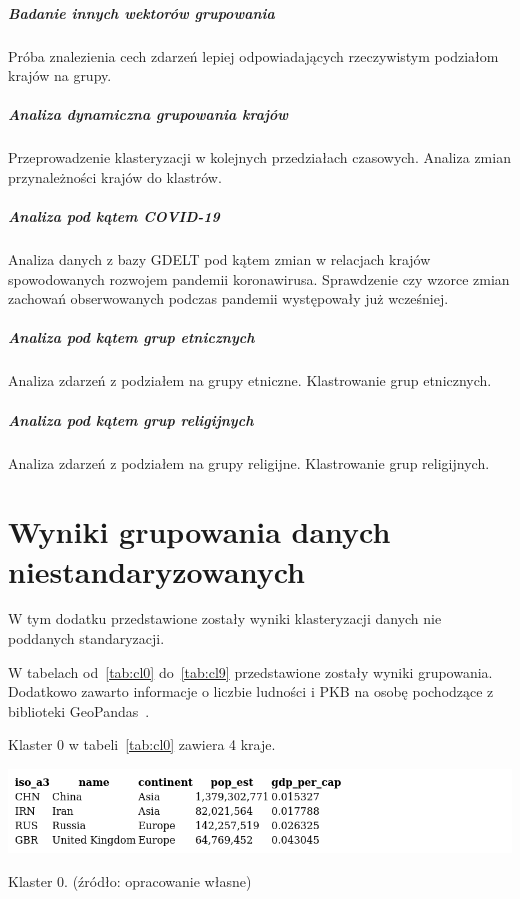 \documentclass[11pt]{report}
\begin{document}
    \paragraph{Badanie innych wektorów grupowania}
    Próba znalezienia cech zdarzeń lepiej odpowiadających rzeczywistym podziałom krajów na grupy.

    \paragraph{Analiza dynamiczna grupowania krajów}
    Przeprowadzenie klasteryzacji w kolejnych przedziałach czasowych.
    Analiza zmian przynależności krajów do klastrów.

    \paragraph{Analiza pod kątem COVID-19}
    Analiza danych z bazy GDELT pod kątem zmian w relacjach krajów spowodowanych rozwojem pandemii koronawirusa.
    Sprawdzenie czy wzorce zmian zachowań obserwowanych podczas pandemii występowały już wcześniej.

    \paragraph{Analiza pod kątem grup etnicznych}
    Analiza zdarzeń z podziałem na grupy etniczne.
    Klastrowanie grup etnicznych.

    \paragraph{Analiza pod kątem grup religijnych}
    Analiza zdarzeń z podziałem na grupy religijne.
    Klastrowanie grup religijnych.

    \appendix
    \newpage


    \chapter[Wyniki grupowania]{Wyniki grupowania danych niestandaryzowanych}\label{ch:dodatek_niestd}
    W tym dodatku przedstawione zostały wyniki klasteryzacji danych nie poddanych standaryzacji.

    W tabelach od~\ref{tab:cl0} do~\ref{tab:cl9} przedstawione zostały wyniki grupowania.
    Dodatkowo zawarto informacje o liczbie ludności i PKB na osobę pochodzące z biblioteki GeoPandas~\cite{geopandas}.

    Klaster 0 w tabeli~\ref{tab:cl0} zawiera 4 kraje.
    \begin{table}[!htp]
        \centering
        \includegraphics[width=\linewidth]{tables/CLUST/clust0kmeans.png}
        \caption{Klaster 0. (źródło: opracowanie własne)}
        \label{tab:cl0}
    \end{table}
\end{document}

